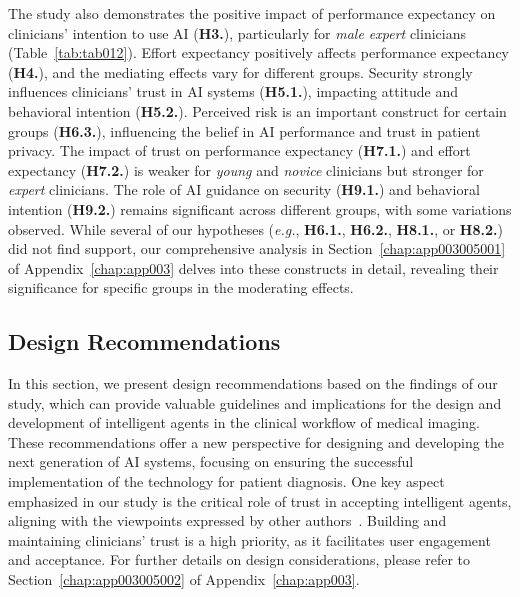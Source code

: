 The study also demonstrates the positive impact of performance expectancy on clinicians' intention to use \ac{AI} ({\bf H3.}), particularly for {\it male expert} clinicians (Table~\ref{tab:tab012}).
Effort expectancy positively affects performance expectancy ({\bf H4.}), and the mediating effects vary for different groups.
Security strongly influences clinicians' trust in \ac{AI} systems ({\bf H5.1.}), impacting attitude and behavioral intention ({\bf H5.2.}).
Perceived risk is an important construct for certain groups ({\bf H6.3.}), influencing the belief in \ac{AI} performance and trust in patient privacy.
The impact of trust on performance expectancy ({\bf H7.1.}) and effort expectancy ({\bf H7.2.}) is weaker for {\it young} and {\it novice} clinicians but stronger for {\it expert} clinicians.
The role of \ac{AI} guidance on security ({\bf H9.1.}) and behavioral intention ({\bf H9.2.}) remains significant across different groups, with some variations observed.
While several of our hypotheses ({\it e.g.}, {\bf H6.1.}, {\bf H6.2.}, {\bf H8.1.}, or {\bf H8.2.}) did not find support, our comprehensive analysis in Section~\ref{chap:app003005001} of Appendix~\ref{chap:app003} delves into these constructs in detail, revealing their significance for specific groups in the moderating effects.

\subsection{Design Recommendations}
\label{sec:chap004006002}

In this section, we present design recommendations based on the findings of our study, which can provide valuable guidelines and implications for the design and development of intelligent agents in the clinical workflow of medical imaging.
These recommendations offer a new perspective for designing and developing the next generation of \ac{AI} systems, focusing on ensuring the successful implementation of the technology for patient diagnosis.
One key aspect emphasized in our study is the critical role of trust in accepting intelligent agents, aligning with the viewpoints expressed by other authors~\cite{LIU2022107026}.
Building and maintaining clinicians' trust is a high priority, as it facilitates user engagement and acceptance.
For further details on design considerations, please refer to Section~\ref{chap:app003005002} of Appendix~\ref{chap:app003}.

\vspace{1.50mm}

